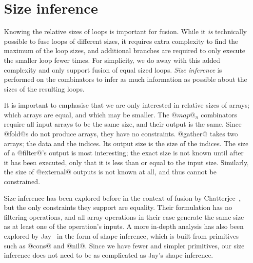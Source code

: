 \section{Size inference}

Knowing the relative sizes of loops is important for fusion.
While it \emph{is} technically possible to fuse loops of different sizes, it requires extra complexity to find the maximum of the loop sizes, and additional branches are required to only execute the smaller loop fewer times. For simplicity, we do away with this added complexity and only support fusion of equal sized loops. \emph{Size inference} is performed on the combinators to infer as much information as possible about the sizes of the resulting loops.

It is important to emphasise that we are only interested in relative sizes of arrays; which arrays are equal, and which may be smaller.
The $@map@_n$ combinators require all input arrays to be the same size, and their output is the same.
Since @fold@s do not produce arrays, they have no constraints.
@gather@ takes two arrays; the data and the indices. Its output size is the size of the indices.
The size of a @filter@'s output is most interesting; the exact size is not known until after it has been executed, only that it is less than or equal to the input size.
Similarly, the size of @external@ outputs is not known at all, and thus cannot be constrained.

Size inference has been explored before in the context of fusion by Chatterjee~\cite{chatterjee1991size}, but the only constraints they support are equality.
Their formulation has no filtering operations, and all array operations in their case generate the same size as at least one of the operation's inputs.
A more in-depth analysis has also been explored by Jay~\cite{jay1996shape} in the form of shape inference, which is built from primitives such as @cons@ and @nil@.
Since we have fewer and simpler primitives, our size inference does not need to be as complicated as Jay's shape inference.


\newcommand{\constr}[1]{\llbracket #1 \rrbracket}
\newcommand{\hole}[0]{[]}
\newcommand{\fillhole}[2]{#1\left[#2\right]}

